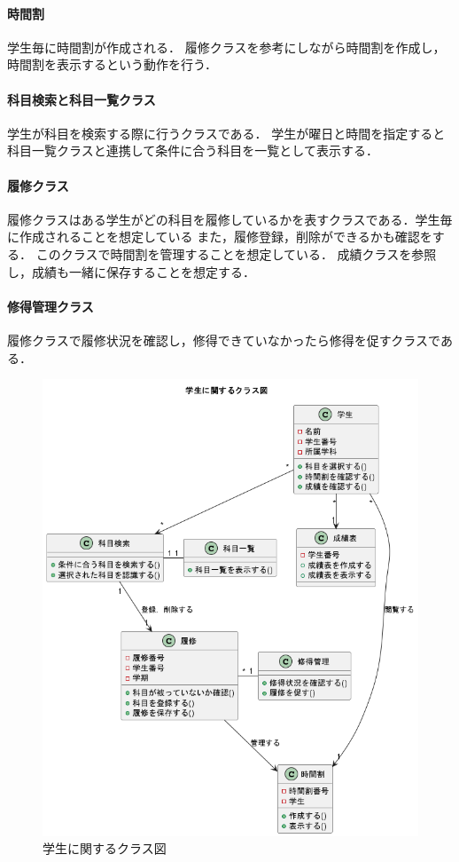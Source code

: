 \documentclass[documentclass]{jsarticle}
\begin{document}
\paragraph*{時間割}
学生毎に時間割が作成される．
履修クラスを参考にしながら時間割を作成し，時間割を表示するという動作を行う．

\paragraph*{科目検索と科目一覧クラス}
学生が科目を検索する際に行うクラスである．
学生が曜日と時間を指定すると科目一覧クラスと連携して条件に合う科目を一覧として表示する．

\paragraph*{履修クラス}
履修クラスはある学生がどの科目を履修しているかを表すクラスである．学生毎に作成されることを想定している
また，履修登録，削除ができるかも確認をする．
このクラスで時間割を管理することを想定している．
成績クラスを参照し，成績も一緒に保存することを想定する．

\paragraph*{修得管理クラス}
履修クラスで履修状況を確認し，修得できていなかったら修得を促すクラスである．

\begin{figure}[H]
  \begin{center}
    \includegraphics*[scale=0.4]{figure/5-3.png}
  \end{center}
  \caption{学生に関するクラス図}
  \label{fig:5-3}
\end{figure}
\end{document}
